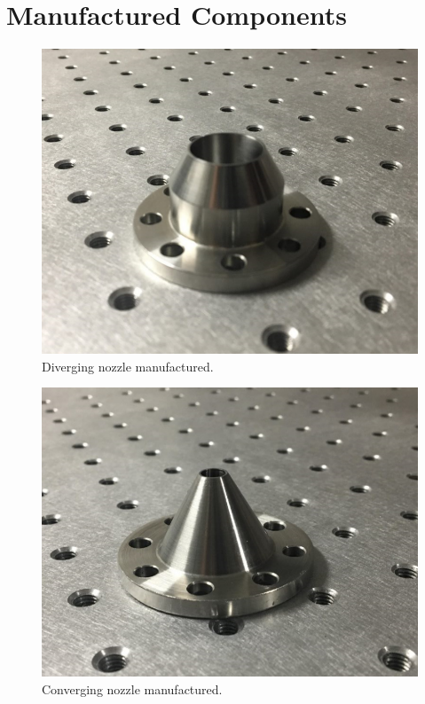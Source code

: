 \section{Manufactured Components} \label{app:manufactured}

\begin{figure}[H] 
	\centering
	\includegraphics[scale=1.2]{fig11.PNG} 
	\caption{Diverging nozzle manufactured.}
	\label{fig:11}
\end{figure}

\begin{figure}[H] 
	\centering
	\includegraphics[scale=1.35]{fig12.PNG} 
	\caption{Converging nozzle manufactured.}
	\label{fig:12}
\end{figure}

